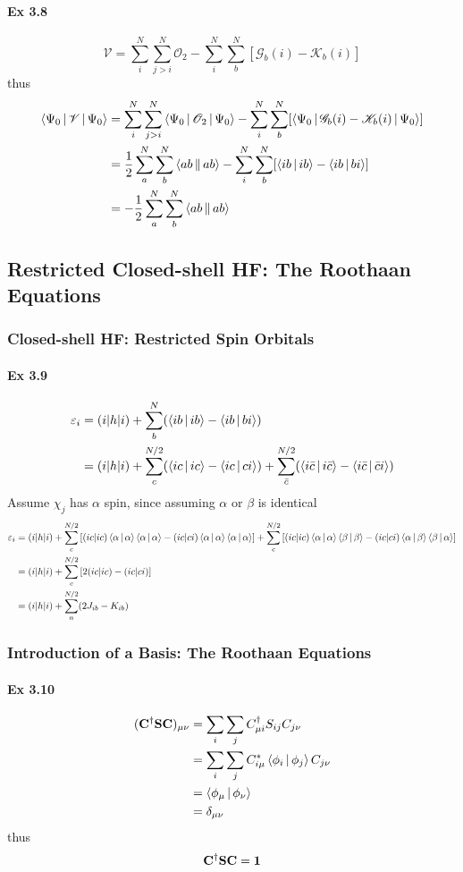 \documentclass[a4paper]{article}
\newcommand{\iden}{{\large \bm{1}}}
\newcommand{\ex}[1]{\paragraph{Ex #1}}
\numberwithin{equation}{subsection}
\begin{document}
\ex{3.8}
\begin{equation}\label{key}
\mathscr{V} = \sum_i^N \sum_{j>i}^N \mathscr{O}_2 - \sum_i^N\sum_b^N [\mathscr{G}_b(i) - \mathscr{K}_b(i)]
\end{equation}
thus
\begin{align}
\Braket{\Psi_0 | \mathscr{V} | \Psi_0} &= \sum_i^N \sum_{j>i}^N \Braket{\Psi_0 | \mathscr{O}_2 | \Psi_0} - \sum_i^N\sum_b^N [\Braket{\Psi_0 | \mathscr{G}_b(i) - \mathscr{K}_b(i)| \Psi_0}] \notag\\
&= \dfrac{1}{2}\sum_a^N \sum_b^N \Braket{ab||ab} - \sum_i^N\sum_b^N [\Braket{ib|ib} - \Braket{ib|bi}] \notag\\
&= -\dfrac{1}{2}\sum_a^N \sum_b^N \Braket{ab||ab}
\end{align}

\subsection{Restricted Closed-shell HF: The Roothaan Equations}
\subsubsection{Closed-shell HF: Restricted Spin Orbitals}
\ex{3.9}
\begin{align}
\varepsilon_i %
&= (i|h|i) + \sum_b^N(\Braket{ib|ib} - \Braket{ib|bi}) \notag\\
&= (i|h|i) + \sum_c^{N/2}(\Braket{ic|ic} - \Braket{ic|ci}) + \sum_{\bar{c}}^{N/2}(\Braket{i\bar{c}|i\bar{c}} - \Braket{i\bar{c}|\bar{c}i}) 
\end{align}
Assume $ \chi_j $ has $ \alpha $ spin, since assuming $ \alpha $ or $ \beta $ is identical
\begin{align}
\varepsilon_i &= (i|h|i) + \sum_c^{N/2}\qty[ (ic|ic)\Braket{\alpha|\alpha}\Braket{\alpha|\alpha} 
- (ic|ci)\Braket{\alpha|\alpha}\Braket{\alpha|\alpha}]
+ \sum_c^{N/2}\qty[(ic|ic)\Braket{\alpha|\alpha}\Braket{\beta|\beta} 
- (ic|ci)\Braket{\alpha|\beta}\Braket{\beta|\alpha}] \notag\\
&= (i|h|i) + \sum_c^{N/2}\qty[ 2(ic|ic) - (ic|ci)] \notag\\
&= (i|h|i) + \sum_n^{N/2} (2J_{ib} - K_{ib})
\end{align}

\subsubsection{Introduction of a Basis: The Roothaan Equations}
\ex{3.10}
\begin{align}
(\vb{C}^\dagger \vb{S} \vb{C})_{\mu\nu} &= \sum_i\sum_j C^\dagger_{\mu i} S_{ij} C_{j\nu} \notag\\
&= \sum_i\sum_j C^*_{i\mu} \Braket{\phi_i| \phi_j} C_{j\nu} \notag\\
&= \Braket{\phi_\mu | \phi_\nu} \notag\\
&= \delta_{\mu\nu}
\end{align}
thus
\begin{equation}\label{key}
\vb{C}^\dagger \vb{S} \vb{C} = \iden
\end{equation}
\end{document}
